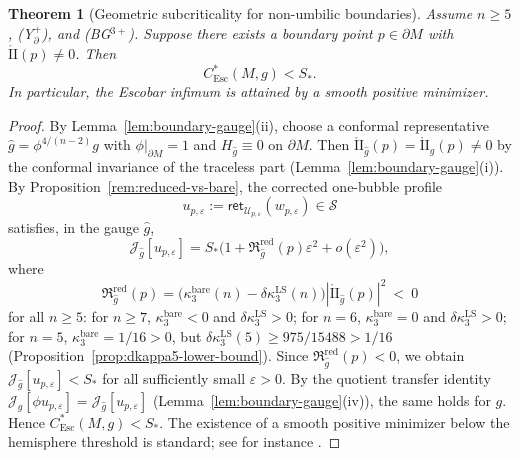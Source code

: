 \documentclass[11pt,reqno,a4paper]{amsart}
\numberwithin{equation}{section}
\theoremstyle{plain}
\newtheorem{theorem}{Theorem}[section]
\newcommand{\Esc}{\ensuremath{\mathrm{Esc}}}
\theoremstyle{remark}
\theoremstyle{plain}
\begin{document}
\begin{theorem}[Geometric subcriticality for non-umbilic boundaries]
\label{thm:subcriticality-nonumbilic}
Assume $n \ge 5$, \textup{(Y$^+_{\partial}$)}, and \textup{(BG$^{3+}$)}.
Suppose there exists a boundary point $p\in\partial M$ with
$\mathring{\mathrm{II}}(p) \neq 0$.
Then
\[
C^*_{\mathrm{Esc}}(M, g) < S_\ast.
\]
In particular, the Escobar
infimum is attained by a smooth positive minimizer.
\end{theorem}

\begin{proof}
By Lemma~\ref{lem:boundary-gauge}(ii), choose a conformal representative
$\hat g=\phi^{4/(n-2)}g$ with $\phi|_{\partial M}=1$ and
$H_{\hat g}\equiv0$ on $\partial M$.
Then $\mathring{\mathrm{II}}_{\hat g}(p)=\mathring{\mathrm{II}}_g(p)\neq 0$
by the conformal invariance of the traceless part
(Lemma~\ref{lem:boundary-gauge}(i)).
By Proposition~\ref{rem:reduced-vs-bare}, the corrected one-bubble profile
\[
u_{p,\varepsilon}:=\mathsf{ret}_{\mathcal U_{p,\varepsilon}}(w_{p,\varepsilon})\in\mathcal S
\]
satisfies, in the gauge $\hat g$,
\[
\mathcal J_{\hat g}[u_{p,\varepsilon}]
=S_\ast\bigl(1+\mathfrak R_{\hat g}^{\mathrm{red}}(p)\varepsilon^2+o(\varepsilon^2)\bigr),
\]
where
\[
\mathfrak R_{\hat g}^{\mathrm{red}}(p)
= \big(\kappa_3^{\mathrm{bare}}(n) - \delta\kappa_3^{\mathrm{LS}}(n)\big)
|\mathring{\mathrm{II}}_{\hat g}(p)|^2
\ <\ 0
\]
for all $n\ge5$:
for $n\ge7$, $\kappa_3^{\mathrm{bare}}<0$ and $\delta\kappa_3^{\mathrm{LS}}>0$;
for $n=6$, $\kappa_3^{\mathrm{bare}}=0$ and $\delta\kappa_3^{\mathrm{LS}}>0$;
for $n=5$, $\kappa_3^{\mathrm{bare}}=1/16>0$, but
$\delta\kappa_3^{\mathrm{LS}}(5)\ge 975/15488 > 1/16$
(Proposition~\ref{prop:dkappa5-lower-bound}).
Since $\mathfrak R_{\hat g}^{\mathrm{red}}(p)<0$, we obtain
$\mathcal J_{\hat g}[u_{p,\varepsilon}]<S_\ast$ for all sufficiently small $\varepsilon>0$.
By the quotient transfer identity
$\mathcal J_g[\phi u_{p,\varepsilon}]=\mathcal J_{\hat g}[u_{p,\varepsilon}]$
(Lemma~\ref{lem:boundary-gauge}(iv)), the same holds for $g$.
Hence $C_{\Esc}^*(M,g)<S_\ast$.
The existence of a smooth positive minimizer below the hemisphere threshold is standard;
see for instance \cite{Cherrier1984,EscobarAnnals92,EscobarJDG92}.
\end{proof}
\end{document}
